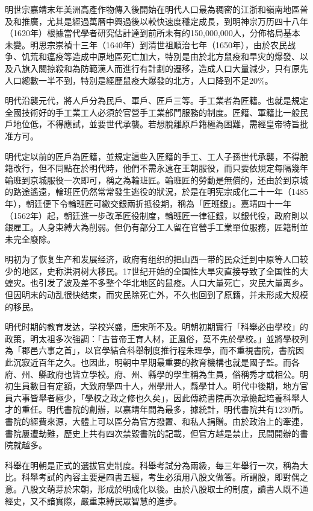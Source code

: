 明世宗嘉靖末年美洲高產作物傳入後開始在明代人口最為稠密的江浙和嶺南地區普及和推廣，尤其是經過萬曆中興過後以較快速度穩定成長，到明神宗万历四十八年（1620年）根據當代學者研究估計達到前所未有的150,000,000人，分佈格局基本未變。明思宗崇禎十三年（1640年）到清世祖順治七年（1650年），由於农民战争、饥荒和瘟疫等造成中原地區死亡加大，特別是由於北方鼠疫和旱灾的爆發、以及八旗入關掠殺和為防範漢人而進行有計劃的遷移，造成人口大量減少，只有原先人口總數一半不到，特別是經歷鼠疫大爆發的北方，人口降到不足20\%。

明代沿襲元代，將人戶分為民戶、軍戶、匠戶三等。手工業者為匠籍。也就是規定全國技術好的手工業工人必須於官營手工業部門服務的制度。匠籍、軍籍比一般民戶地位低，不得應試，並要世代承襲。若想脫離原戶籍極為困難，需經皇帝特旨批准方可。

明代定以前的匠戶為匠籍，並規定這些入匠籍的手工、工人子孫世代承襲，不得脫籍改行，但不同點在於明代時，他們不需永遠在王朝服役，而只要依規定每隔幾年輪班到京城服役一次即可，稱之為輪班匠。輪班匠的勞動是無償的，还由於到京城的路途遙遠，輪班匠仍然常常發生逃役的狀況，於是在明宪宗成化二十一年（1485年），朝廷便下令輪班匠可繳交銀兩折抵役期，稱為「匠班銀」。嘉靖四十一年（1562年）起，朝廷進一步改革匠役制度，輪班匠一律征銀，以銀代役，政府則以銀雇工。人身束縛大為削弱。但仍有部分工人留在官營手工業單位服務，匠籍制並未完全廢除。

明初为了恢复生产和发展经济，政府有组织的把山西一带的民众迁到中原等人口较少的地区，史称洪洞树大移民。17世纪开始的全国性大旱灾直接导致了全国性的大蝗灾。也引发了波及差不多整个华北地区的鼠疫。人口大量死亡，灾民大量离乡。但因明末的动乱很快结束，而灾民除死亡外，不久也回到了原籍，并未形成大规模的移民。

明代时期的教育发达，学校兴盛，唐宋所不及。明朝初期實行「科舉必由學校」的政策，明太祖多次強調：「古昔帝王育人材，正風俗，莫不先於學校。」並將學校列為「郡邑六事之首」，以官學結合科舉制度推行程朱理學，而不重視書院，書院因此沉寂近百年之久。也因此，明朝中早期最重要的教育機構也就是國子監。而各府、州、縣政府也皆立學校。府、州、縣學的學生稱為生員，俗稱秀才或相公。明初生員數目有定額，大致府學四十人，州學卅人，縣學廿人。明代中後期，地方官員六事皆舉者極少，「學校之政之修也久矣」，因此傳統書院再次承擔起培養科舉人才的重任。明代書院的創辦，以嘉靖年間為最多，據統計，明代書院共有1239所。書院的經費來源，大體上可以區分為官方撥置、和私人捐贈。由於政治上的牽連，書院屢遭劫難，歷史上共有四次禁毀書院的記載，但官方越是禁止，民間開辦的書院就越多。

科舉在明朝是正式的選拔官吏制度。科舉考試分為兩級，每三年舉行一次，稱為大比。科舉考試的內容主要是四書五經，考生必須用八股文做答。所謂股，即對偶之意。八股文萌芽於宋朝，形成於明成化以後。由於八股取士的制度，讀書人既不通經史，又不諳實際，嚴重束縛民眾智慧的進步。

